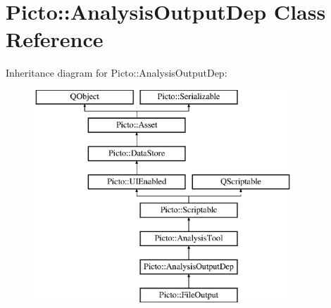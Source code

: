 \hypertarget{class_picto_1_1_analysis_output_dep}{\section{Picto\-:\-:Analysis\-Output\-Dep Class Reference}
\label{class_picto_1_1_analysis_output_dep}
}
Inheritance diagram for Picto\-:\-:Analysis\-Output\-Dep\-:\begin{figure}[H]
\begin{center}
\leavevmode
\includegraphics[height=8.000000cm]{class_picto_1_1_analysis_output_dep}
\end{center}
\end{figure}
